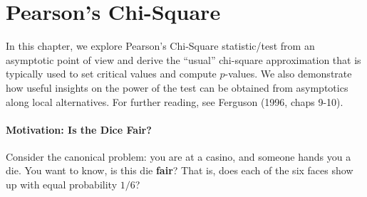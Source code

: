 %
%
%
%

\chapter{Pearson's Chi-Square}
\label{cha:Pearson's Chi-Square}

In this chapter, we explore Pearson’s Chi-Square statistic/test from an asymptotic point of view and derive the ``usual'' chi-square approximation that is typically used to set critical values and compute $p$-values. We also demonstrate how useful insights on the power of the test can be obtained from asymptotics along local alternatives. For further reading, see Ferguson (1996, chaps 9-10).

\subsubsection{Motivation: Is the Dice Fair?}
Consider the canonical problem: you are at a casino, and someone hands you a die. You want to know, is this die \textbf{fair}? That is, does each of the six faces show up with equal probability $1/6$?

